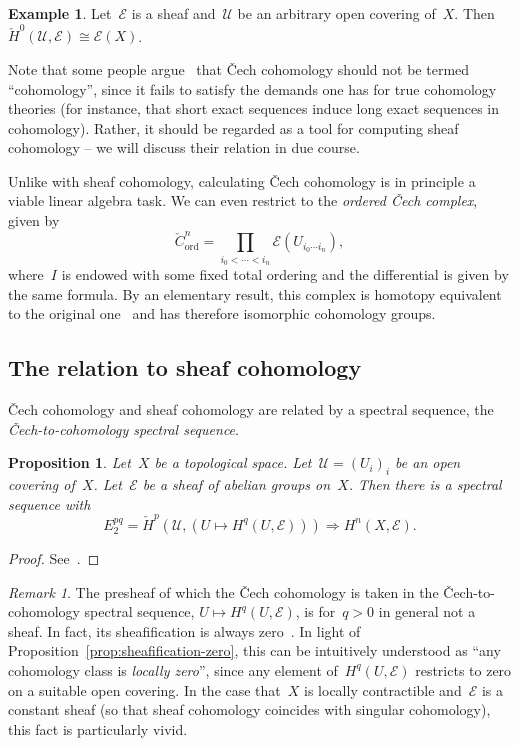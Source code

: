 \documentclass[10pt]{amsart}
\theoremstyle{definition}
\newtheorem{ex}[defn]{Example}
\theoremstyle{plain}
\newtheorem{prop}[defn]{Proposition}
\theoremstyle{remark}
\newtheorem{rem}[defn]{Remark}
\newcommand{\E}{\mathcal{E}}
\newcommand{\U}{\mathcal{U}}
\newcommand{\stackhref}[1]{\href{http://stacks.math.columbia.edu/tag/#1}{#1}}
\begin{document}
\begin{ex}Let~$\E$ is a sheaf and~$\U$ be an arbitrary open covering of~$X$.
Then~$\check H^0(\U,\E) \cong \E(X)$.\end{ex}

Note that some people argue~\cite{nLab:cech} that Čech cohomology should not be
termed ``cohomology'', since it fails to satisfy the demands one has for true
cohomology theories (for instance, that short exact sequences induce long exact
sequences in cohomology). Rather, it should be regarded as a tool for computing
sheaf cohomology -- we will discuss their relation in due course.

Unlike with sheaf cohomology, calculating Čech cohomology is in principle a
viable linear algebra task. We can even restrict to the \emph{ordered Čech
complex}, given by
\[ \check C^n_{\text{ord}} = \prod_{i_0 < \cdots < i_n} \E(U_{i_0 \cdots i_n}),
\]
where~$I$ is endowed with some fixed total ordering and the differential is
given by the same formula. By an elementary result, this complex is homotopy
equivalent to the original one~\cite[Tag~\stackhref{01FG}]{stacks-project} and
has therefore isomorphic cohomology groups.


\subsection{The relation to sheaf cohomology}

Čech cohomology and sheaf cohomology are related by a spectral sequence, the
\emph{Čech-to-cohomology spectral sequence}.
\begin{prop}Let~$X$ be a topological space. Let~$\U = (U_i)_i$ be an open
covering of~$X$. Let~$\E$ be a sheaf of abelian groups on~$X$. Then there is a
spectral sequence with
\[ E_2^{pq} = \check H^p(\U, (U \mapsto H^q(U,\E))) \Longrightarrow
  H^n(X, \E). \]
\end{prop}
\begin{proof}See~\cite[Tag~\stackhref{01ES}]{stacks-project}.
\end{proof}

\begin{rem}The presheaf of which the Čech cohomology is taken in the
Čech-to-cohomology spectral sequence, $U \mapsto H^q(U,\E)$, is for~$q > 0$ in general not
a sheaf. In fact, its sheafification is always
zero~\cite[Tag~\stackhref{03BA}]{stacks-project}. In light of
Proposition~\ref{prop:sheafification-zero}, this can be intuitively understood
as ``any cohomology class is \emph{locally zero}'', since any element
of~$H^q(U,\E)$ restricts to zero on a suitable open covering. In the case
that~$X$ is locally contractible and~$\E$ is a constant sheaf (so that sheaf
cohomology coincides with singular cohomology), this fact is particularly
vivid.
\end{rem}
\end{document}
